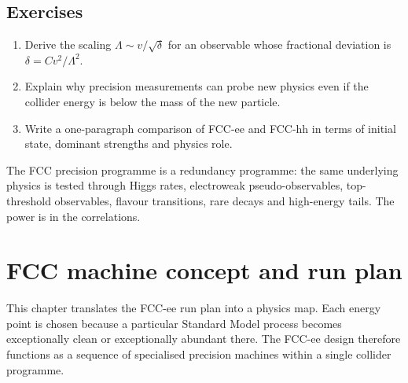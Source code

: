 \documentclass[11pt,a4paper]{article}
\numberwithin{equation}{section}
\begin{document}
\subsection{Exercises}
\begin{enumerate}[leftmargin=1.6em]
\item Derive the scaling \(\Lambda\sim v/\sqrt{\delta}\) for an observable whose fractional deviation is \(\delta=Cv^2/\Lambda^2\).
\item Explain why precision measurements can probe new physics even if the collider energy is below the mass of the new particle.
\item Write a one-paragraph comparison of FCC-ee and FCC-hh in terms of initial state, dominant strengths and physics role.
\end{enumerate}

\begin{takehomebox}
The FCC precision programme is a redundancy programme: the same underlying physics is tested through Higgs rates, electroweak pseudo-observables, top-threshold observables, flavour transitions, rare decays and high-energy tails. The power is in the correlations.
\end{takehomebox}


\newpage
\section{FCC machine concept and run plan}
\begin{guidelinebox}
This chapter translates the FCC-ee run plan into a physics map. Each energy point is chosen because a particular Standard Model process becomes exceptionally clean or exceptionally abundant there. The FCC-ee design therefore functions as a sequence of specialised precision machines within a single collider programme.
\end{guidelinebox}
\end{document}
